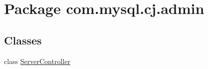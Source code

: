 \hypertarget{namespacecom_1_1mysql_1_1cj_1_1admin}{}\section{Package com.\+mysql.\+cj.\+admin}
\label{namespacecom_1_1mysql_1_1cj_1_1admin}
\subsection*{Classes}
\begin{DoxyCompactItemize}
\item 
class \mbox{\hyperlink{classcom_1_1mysql_1_1cj_1_1admin_1_1_server_controller}{Server\+Controller}}
\end{DoxyCompactItemize}
